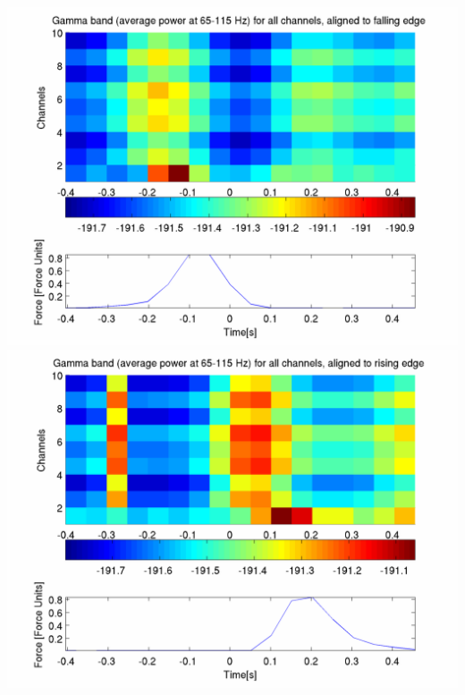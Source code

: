 \documentclass[12pt]{article}
\begin{document}
\includegraphics[scale=0.2]{gamma_falling_log.png}
\includegraphics[scale=0.2]{gamma_rising_log.png}
\end{document}
